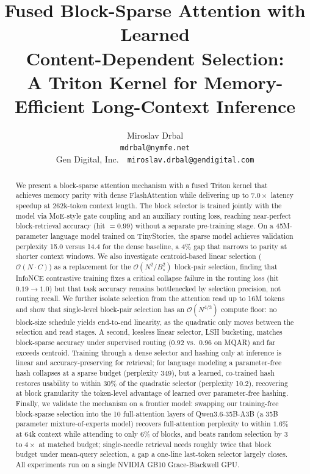 \documentclass[10pt,letterpaper]{article}
\title{Fused Block-Sparse Attention with Learned\\
Content-Dependent Selection:\\[4pt]
\large A Triton Kernel for Memory-Efficient Long-Context Inference}
\author{%
  Miroslav Drbal\\
  \texttt{mdrbal@nymfe.net}\\
  Gen Digital, Inc.~\textbar~\texttt{miroslav.drbal@gendigital.com}
}
\date{}
\newcommand{\Ocomplex}{\mathcal{O}}
\begin{document}
\maketitle

\begin{abstract}
We present a block-sparse attention mechanism with a fused Triton kernel that
achieves memory parity with dense FlashAttention while delivering up to
$7.0\times$ latency speedup at 262k-token context length. The block selector
is trained jointly with the model via MoE-style gate coupling and an auxiliary
routing loss, reaching near-perfect block-retrieval accuracy (hit $= 0.99$)
without a separate pre-training stage. On a 45M-parameter language model
trained on TinyStories, the sparse model achieves validation perplexity
15.0 versus 14.4 for the dense baseline, a 4\% gap that narrows to parity at
shorter context windows. We also investigate centroid-based linear selection
($\Ocomplex(N \cdot C)$) as a replacement for the $\Ocomplex(N^2/B_s^2)$
block-pair selection, finding that InfoNCE contrastive training fixes a
critical collapse failure in the routing loss (hit $0.19 \to 1.0$) but that
task accuracy remains bottlenecked by selection precision, not routing recall.
We further isolate selection from the attention read up to 16M tokens and show
that single-level block-pair selection has an $\Ocomplex(N^{4/3})$ compute
floor: no block-size schedule yields end-to-end linearity, as the quadratic
only moves between the selection and read stages.
A second, lossless linear selector, LSH bucketing, matches block-sparse accuracy
under supervised routing (0.92 vs.\ 0.96 on MQAR) and far exceeds centroid.
Training through a dense selector and hashing only at inference is linear and
accuracy-preserving for retrieval; for language modeling a parameter-free hash
collapses at a sparse budget (perplexity 349), but a learned, co-trained hash
restores usability to within $30\%$ of the quadratic selector (perplexity 10.2),
recovering at block granularity the token-level advantage of learned over
parameter-free hashing.
Finally, we validate the mechanism on a frontier model: swapping our training-free
block-sparse selection into the 10 full-attention layers of Qwen3.6-35B-A3B (a 35B
parameter mixture-of-experts model) recovers full-attention perplexity to within
$1.6\%$ at 64k context while attending to only $6\%$ of blocks, and beats random
selection by $3$ to $4\times$ at matched budget; single-needle retrieval needs
roughly twice that block budget under mean-query selection, a gap a one-line
last-token selector largely closes.
All experiments run on a single NVIDIA GB10 Grace-Blackwell GPU.
\end{abstract}
\end{document}
